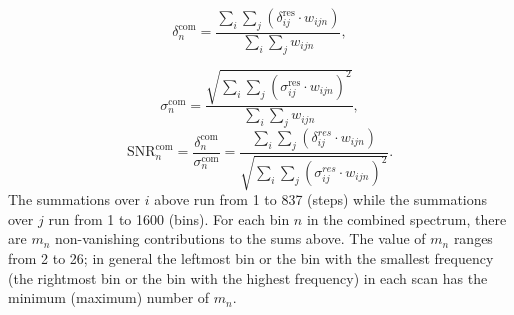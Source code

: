 \begin{equation}
    \label{eq:comb_power}
    \delta_{n}^\text{com} = \frac{\sum\limits_{i}\sum\limits_{j}\left(\delta_{ij}^\text{res} \cdot {w_{ijn}}\right)}{\sum\limits_{i}\sum\limits_{j} {w_{ijn}}},
\end{equation}

\begin{equation}
    \label{eq:comb_sigma}
    \sigma_{n}^\text{com} = \frac{ \sqrt{\sum\limits_{i}\sum\limits_{j}(\sigma_{ij}^\text{res} \cdot {w_{ijn}})^2}}{\sum\limits_{i}\sum\limits_{j} {w_{ijn}}},
\end{equation}
\begin{equation}
    \label{eq:comb_snr}
    \text{SNR}_{n}^\text{com} = \frac{\delta^\text{com}_{n}}{\sigma^\text{com}_{n}}= \frac{\sum\limits_{i}\sum\limits_{j}\left(\delta_{ij}^{res} \cdot {w_{ijn}}\right)}{ \sqrt{\sum\limits_{i}\sum\limits_{j}(\sigma_{ij}^{res} \cdot {w_{ijn}})^2}}.
\end{equation} 
The summations over $i$ above run from 1 to 837 (steps) while the summations 
over $j$ run from 1 to 1600 (bins).  
For each bin $n$ in the combined spectrum, there are $m_n$ non-vanishing 
contributions to the sums above. The value of $m_n$ ranges from 2 to 26; 
in general the leftmost bin or the bin with the smallest frequency 
(the rightmost bin or the bin with the highest frequency) in each scan has 
the minimum (maximum) number of $m_n$. 



